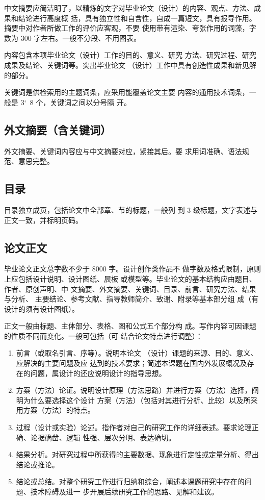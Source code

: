 \documentclass{swfuthesis}
\begin{document}
中文摘要应简洁明了，以精炼的文字对毕业论文（设计）的内容、观点、方法、成果和结论进行高度概
括，具有独立性和自含性，自成一篇短文，具有报导作用。摘要中对作者所做工作的评价应客观，不要
使用带有渲染、夸张作用的词藻，字数为 300 字左右。一般不分段、不用图表。

内容包含本项毕业论文（设计）工作的目的、意义、研究
方法、研究过程、研究成果及结论、关键词等。突出毕业论文
（设计）工作中具有创造性成果和新见解的部分。

关键词是供检索用的主题词条，应采用能覆盖论文主要
内容的通用技术词条，一般是 3\char`~8 个，关键词之间以分号隔
开。

\subsection{外文摘要（含关键词）}

外文摘要、关键词内容应与中文摘要对应，紧接其后。要
求用词准确、语法规范、意思完整。

\subsection{目录}

目录独立成页，包括论文中全部章、节的标题，一般列
到 3 级标题，文字表述与正文一致，并标明页码。

\subsection{论文正文}

毕业论文正文总字数不少于 8000 字。设计创作类作品不
做字数及格式限制，原则上应包括设计说明、设计图纸、展板
或模型等。毕业论文的基本结构应由题目、作者、原创声明、中
文摘要、外文摘要、关键词、目录、前言、研究方法、结果与分析、
主要结论、参考文献、指导教师简介、致谢、附录等基本部分组
成（有设计的须有设计图纸）。

正文一般由标题、主体部分、表格、图和公式五个部分构
成。写作内容可因课题的性质不同而变化。一般可包括（可
结合论文特点进行调整）：
\begin{enumerate}
\item 前言（或取名引言、序等）。说明本论文 （设计）课题的来源、目的、意义、应解决的主要问题及应
  达到的技术要求；简述本课题在国内外发展概况及存在的问题，属设计的还应说明设计的指导思想。
\item 方案（方法）论证。说明设计原理（方法思路）并进行方案（方法）选择，阐明为什么要选择这个设计
  方案（方法）（包括对其进行分析、比较）以及所采用方案（方法）的特点。
\item 过程（设计或实验）论述。指作者对自己的研究工作的详细表述。要求论理正确、论据确凿、逻辑
  性强、层次分明、表达确切。
\item 结果分析。对研究过程中所获得的主要数据、现象进行定性或定量分析、得出结论或推论。
\item 结论或总结。对整个研究工作进行归纳和综合，阐述本课题研究中存在的问题、技术障碍及进一
  步开展后续研究工作的思路、见解和建议。
\end{enumerate}
\end{document}
